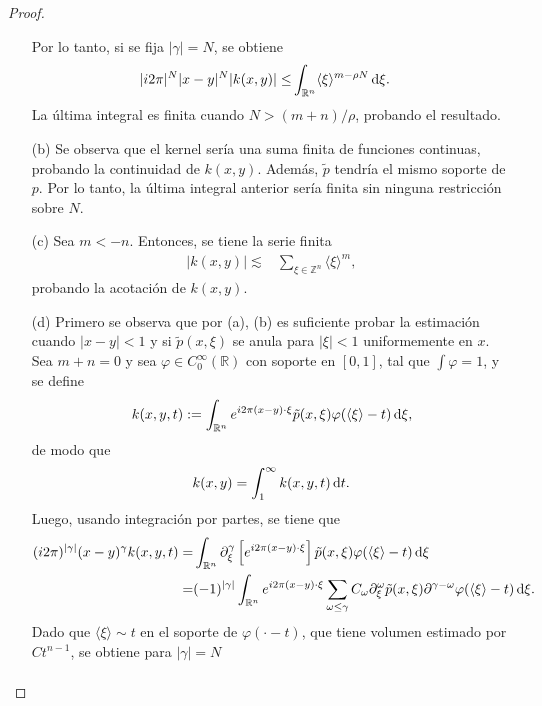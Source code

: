 \begin{proof}
\begin{itemize}
		Por lo tanto, si se fija $|\gamma| = N$, se obtiene
		\begin{align*}
			|i2\pi|^N|x-y|^N| k(x, y)| \leq & \int_{\mathbb{R}^n} \langle\xi\rangle^{m-\rho N} \mathop{}\!\mathrm{d} \xi.
		\end{align*}
		La última integral es finita cuando $N > (m + n)/\rho$, probando el resultado.\\
		\item[(b)] Se observa que el kernel sería una suma finita de funciones continuas, probando la continuidad de $k(x, y)$. Además, $\tilde{p}$ tendría el mismo soporte de $p$. Por lo tanto, la última integral anterior sería finita sin ninguna restricción sobre $N$.\\
		\item[(c)] Sea $ m < -n$. Entonces, se tiene la serie finita
		\begin{align*}
			| k(x, y)| \lesssim &  \sum_{\xi \in \mathbb{Z}^n}\langle\xi\rangle^m,
		\end{align*}
		probando la acotación de $k(x, y)$.\\
		\item[(d)] Primero se observa que por (a), (b) es suficiente probar la estimación cuando $|x-y|<1$ y si $\tilde{p}(x, \xi)$ se anula para $|\xi|<1$ uniformemente en $x$. Sea $m + n = 0$ y sea $\varphi \in C_0^\infty(\mathbb{R})$ con soporte en $[0, 1]$, tal que $\int \varphi=1$, y se define 
		\begin{equation*}
			k(x, y, t) := \int_{\mathbb{R}^n} e^{i2\pi(x-y)\cdot \xi} \tilde{p}(x, \xi) \varphi(\langle\xi\rangle-t) \mathop{}\!\mathrm{d}\xi,
		\end{equation*}
		de modo que
		\begin{equation*}
			k(x, y) = \int_1^\infty k(x, y, t)\mathop{}\!\mathrm{d} t.
		\end{equation*}
		Luego, usando integración por partes, se tiene que
		\begin{align*}
			(i2\pi)^{|\gamma|}(x - y)^\gamma k(x, y, t) = & \int_{\mathbb{R}^n} \partial^\gamma_\xi\left[ e^{i2\pi(x-y)\cdot \xi} \right] \tilde{p}(x, \xi)\varphi(\langle\xi\rangle - t) \mathop{}\!\mathrm{d} \xi \\
			= & (-1)^{|\gamma|} \int_{\mathbb{R}^n} e^{i2\pi(x-y)\cdot \xi} \sum_{\omega \leq \gamma}C_\omega \partial^\omega_\xi \tilde{p}(x, \xi) \partial^{\gamma - \omega}\varphi(\langle\xi\rangle-t) \mathop{}\!\mathrm{d} \xi.
		\end{align*}
		Dado que $\langle\xi\rangle \sim t$ en el soporte de $\varphi(\cdot-t)$, que tiene volumen estimado por $Ct^{n-1}$, se obtiene para $|\gamma|=N$
		\begin{align*}

\end{align*}
\end{itemize}
\end{proof}
